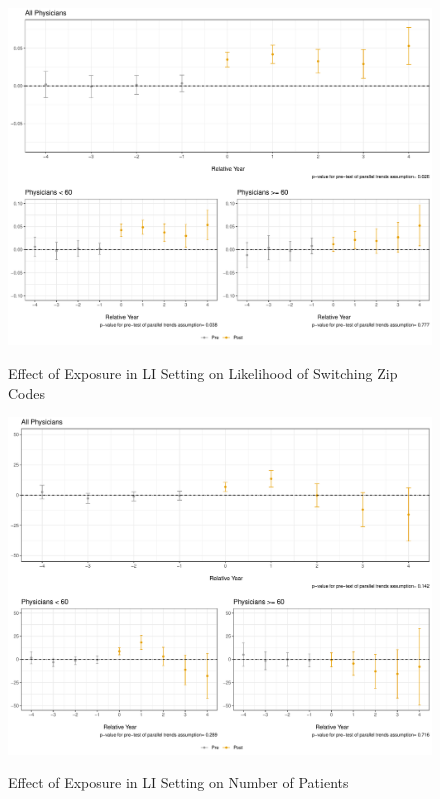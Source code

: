 \documentclass[11pt]{article}
\begin{document}
\begin{figure}[p]
    \centering
    \caption{Effect of Exposure in LI Setting on Likelihood of Switching Zip Codes}
    \includegraphics[scale=.4]{Objects/zip_plot_LI.pdf}
    \label{fig:zip_LI}
\end{figure}

\begin{figure}[p]
    \centering
    \caption{Effect of Exposure in LI Setting on Number of Patients}
    \includegraphics[scale=.4]{Objects/patient_plot_LI.pdf}
    \label{fig:patient_LI}
\end{figure}
\end{document}
